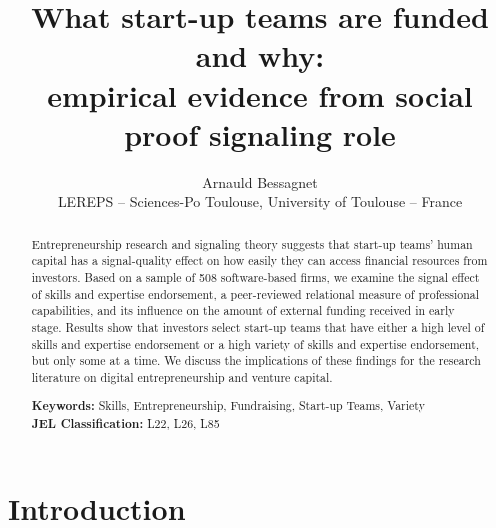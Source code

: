 \documentclass[12pt]{article}
\begin{document}
\title{What start-up teams are funded and why: \\ empirical evidence from social proof signaling role}
\date{\vspace{-3ex}}
\author{Arnauld Bessagnet \\ \footnotesize{LEREPS – Sciences-Po Toulouse, University of Toulouse – France} \\}

\maketitle \vspace{-1,5em}

\begin{abstract}
\noindent
Entrepreneurship research and signaling theory suggests that start-up teams' human capital has a signal-quality effect on how easily they can access financial resources from investors. Based on a sample of 508 software-based firms, we examine the signal effect of skills and expertise endorsement, a peer-reviewed relational measure of professional capabilities, and its influence on the amount of external funding received in early stage. Results show that investors select start-up teams that have either a high level of skills and expertise endorsement or a high variety of skills and expertise endorsement, but only some at a time. We discuss the implications of these findings for the research literature on digital entrepreneurship and venture capital. \newline

\begin{obeylines}
\noindent \footnotesize{}{\textbf{Keywords:} Skills, Entrepreneurship, Fundraising, Start-up Teams, Variety}
\noindent \footnotesize{\textbf{JEL Classification:} L22, L26, L85}
\end{obeylines}

\end{abstract}

\clearpage
\section{Introduction}
\end{document}
